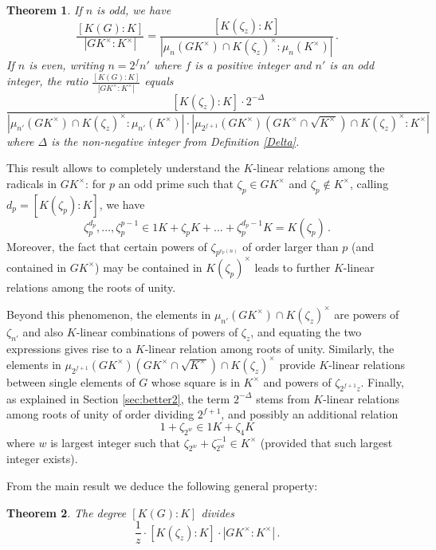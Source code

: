 \documentclass[11pt, a4paper]{amsart}
\newtheorem {thm}{Theorem}
\theoremstyle{definition}
\begin{document}
\begin{thm}\label{mainthm}
If $n$ is odd, we have
$$\frac{[K(G):K]}{|GK^\times:K^\times|}=\frac{[K(\zeta_{z}):K]}{|\mu_{n}(G K^\times)\cap K(\zeta_{z})^\times: \mu_{n}(K^\times)|}\,.$$
If $n$ is even, writing $n=2^f n'$ where $f$ is a positive integer and $n'$ is an odd integer, the ratio $\frac{[K(G):K]}{|GK^\times:K^\times|}$ equals 
$$\frac{[K(\zeta_{z}):K] \cdot 2^{-\Delta}}{|\mu_{n'}(G K^\times)\cap K(\zeta_{z})^\times: \mu_{n'}( K^\times)|\cdot |\mu_{2^{f+1}}(G K^\times)(G K^\times\cap\sqrt{K^\times})\cap K(\zeta_z)^\times: K^\times|}$$
where $\Delta$ is the non-negative integer from Definition \ref{Delta}.
\end{thm}

This result allows to completely understand the $K$-linear relations among the radicals in $GK^\times$: for $p$ an odd prime such that $\zeta_p\in GK^\times$ and $\zeta_p\notin K^\times$, calling $d_p=[K(\zeta_p):K]$, we have 
$$\zeta_p^{d_p}, \ldots, \zeta_{p}^{p-1}\in 1K+\zeta_p K+\ldots+ \zeta_p^{d_p-1} K=K(\zeta_p)\,.$$
Moreover, the fact that certain powers of $\zeta_{p^{v_p(n)}}$ of order larger than $p$ (and contained in $GK^\times$) may be contained in $K(\zeta_p)^\times$ leads to further $K$-linear relations among the roots of unity.

Beyond this phenomenon, the elements in $\mu_{n'}(G K^\times)\cap K(\zeta_{z})^\times$
are powers of $\zeta_{n'}$ and also $K$-linear combinations of powers of $\zeta_{z}$,  and equating the two expressions gives rise to a $K$-linear relation among roots of unity. Similarly, the elements in 
$\mu_{2^{f+1}}(G K^\times)(GK^\times\cap\sqrt{K^\times})\cap K(\zeta_z)^\times$ provide $K$-linear relations between single elements of $G$ whose square is in $K^\times$ and powers of $\zeta_{2^{f+1}z}$. Finally, as explained in Section \ref{sec:better2}, the term $2^{-\Delta}$ stems from $K$-linear relations among roots of unity of order dividing $2^{f+1}$, and possibly an additional relation
$$1+\zeta_{2^w}\in 1K+\zeta_4K$$
where $w$ is largest integer such that $\zeta_{2^w}+\zeta_{2^w}^{-1}\in K^\times$ (provided that such largest integer exists).

From the main result we deduce the following general property:

\begin{thm}\label{divisibility}
The degree $[K(G):K]$ divides 
$$\frac{1}{z} \cdot [K(\zeta_z):K]  \cdot |GK^{\times}:K^{\times}|\,.$$
\end{thm}
\end{document}
